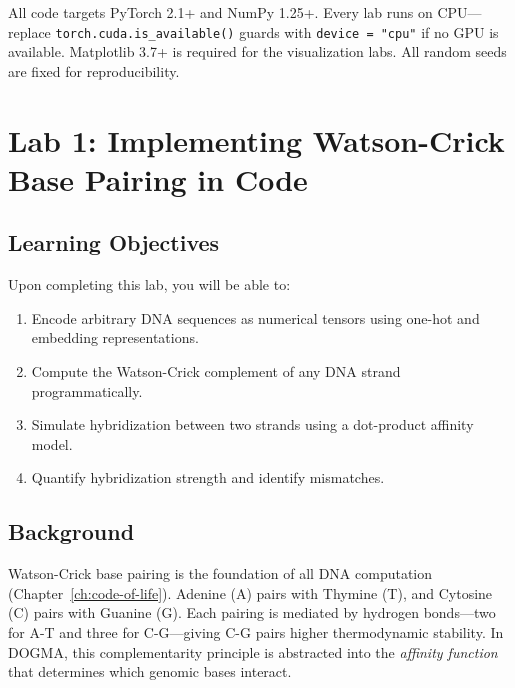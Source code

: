 \begin{implnote}
All code targets PyTorch 2.1+ and NumPy 1.25+. Every lab runs on CPU---replace \texttt{torch.cuda.is\_available()} guards with \texttt{device = "cpu"} if no GPU is available. Matplotlib 3.7+ is required for the visualization labs. All random seeds are fixed for reproducibility.
\end{implnote}


\section{Lab 1: Implementing Watson-Crick Base Pairing in Code}
\label{sec:lab1-base-pairing}

\subsection{Learning Objectives}

Upon completing this lab, you will be able to:
\begin{enumerate}[leftmargin=1.8em]
  \item Encode arbitrary DNA sequences as numerical tensors using one-hot and embedding representations.
  \item Compute the Watson-Crick complement of any DNA strand programmatically.
  \item Simulate hybridization between two strands using a dot-product affinity model.
  \item Quantify hybridization strength and identify mismatches.
\end{enumerate}

\subsection{Background}

Watson-Crick base pairing is the foundation of all DNA computation (Chapter~\ref{ch:code-of-life}). Adenine (A) pairs with Thymine (T), and Cytosine (C) pairs with Guanine (G). Each pairing is mediated by hydrogen bonds---two for A-T and three for C-G---giving C-G pairs higher thermodynamic stability. In DOGMA, this complementarity principle is abstracted into the \emph{affinity function} that determines which genomic bases interact.

